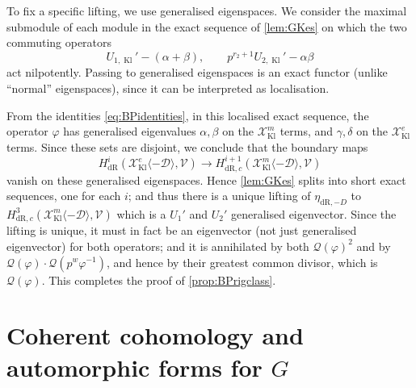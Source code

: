\documentclass[cjm]{ipart}
\theoremstyle{plain}
\theoremstyle{remark}
\DeclareMathOperator{\Kl}{Kl}
\newcommand{\cD}{\mathcal{D}}
\newcommand{\cQ}{\mathcal{Q}}
\newcommand{\cV}{\mathcal{V}}
\newcommand{\cX}{\mathcal{X}}
\newcommand{\dR}{\mathrm{dR}}
\numberwithin{equation}{subsection}
\begin{document}
  To fix a specific lifting, we use generalised eigenspaces. We consider the maximal submodule of each module in the exact sequence of \cref{lem:GKes} on which the two commuting operators
  \[
   U_{1, \Kl}' - (\alpha + \beta), \qquad p^{r_2 + 1} U_{2, \Kl}' - \alpha \beta
  \]
  act nilpotently. Passing to generalised eigenspaces is an exact functor (unlike ``normal'' eigenspaces), since it can be interpreted as localisation.

  From the identities \eqref{eq:BPidentities}, in this localised exact sequence, the operator $\varphi$ has generalised eigenvalues $\alpha, \beta$ on the $\cX_{\Kl}^m$ terms, and $\gamma, \delta$ on the $\cX_{\Kl}^e$ terms. Since these sets are disjoint, we conclude that the boundary maps
  \[ H^i_{\dR}(\cX_{\Kl}^e\langle -\cD\rangle,\cV) \to H^{i+1}_{\dR, c}(\cX_{\Kl}^m\langle -\cD\rangle,\cV) \]
  vanish on these generalised eigenspaces. Hence \cref{lem:GKes} splits into short exact sequences, one for each $i$; and thus there is a unique lifting of $\eta_{\dR, -D}$ to $H^{3}_{\dR, c}(\cX_{\Kl}^m\langle -\cD\rangle,\cV)$ which is a $U_1'$ and $U_2'$ generalised eigenvector. Since the lifting is unique, it must in fact be an eigenvector (not just generalised eigenvector) for both operators; and it is annihilated by both $\cQ(\varphi)^2$ and by $\cQ(\varphi) \cdot\cQ(p^w\varphi^{-1})$, and hence by their greatest common divisor, which is $\cQ(\varphi)$. This completes the proof of \cref{prop:BPrigclass}.







\section{Coherent cohomology and automorphic forms for \texorpdfstring{$G$}{G}}

\end{document}

